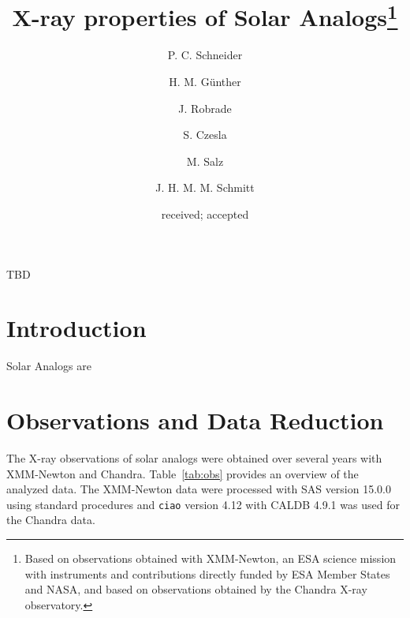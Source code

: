 \documentclass[oldversion]{aa}
\begin{document}
 

\title{X-ray properties of Solar Analogs\thanks{Based on observations obtained with XMM-Newton, an ESA science mission with instruments and contributions directly funded by ESA Member States and NASA, and based on observations obtained by the Chandra X-ray observatory.}}


   \author{P. C. Schneider
          \and
          H. M. G\"unther
          \and
          J. Robrade
          \and
          S. Czesla
          \and
          M. Salz
          \and
          J. H. M. M. Schmitt
          }

     
               
   \date{received; accepted}

 
  \abstract
   {
TBD
     }


   \maketitle
   
\section{Introduction}
Solar Analogs are



\section{Observations and Data Reduction}
The X-ray observations of solar analogs were obtained over several years with XMM-Newton and Chandra. Table~\ref{tab:obs} provides an overview of the analyzed data. The XMM-Newton data were processed with SAS version 15.0.0 using standard procedures
and \texttt{ciao} version 4.12 with CALDB 4.9.1 was used for the Chandra data.




 

\end{document}

